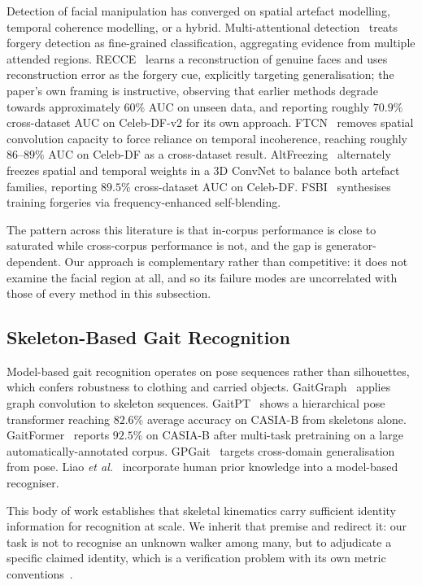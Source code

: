 \documentclass[journal]{IEEEtran}
\begin{document}
Detection of facial manipulation has converged on spatial artefact modelling,
temporal coherence modelling, or a hybrid. Multi-attentional
detection~\cite{multi_attn} treats forgery detection as fine-grained
classification, aggregating evidence from multiple attended regions.
RECCE~\cite{recce} learns a reconstruction of genuine faces and uses
reconstruction error as the forgery cue, explicitly targeting generalisation;
the paper's own framing is instructive, observing that earlier methods degrade
towards approximately $60\%$ AUC on unseen data, and reporting roughly $70.9\%$
cross-dataset AUC on Celeb-DF-v2 for its own approach. FTCN~\cite{ftcn} removes
spatial convolution capacity to force reliance on temporal incoherence,
reaching roughly $86$--$89\%$ AUC on Celeb-DF as a cross-dataset result.
AltFreezing~\cite{altfreezing} alternately freezes spatial and temporal weights
in a 3D ConvNet to balance both artefact families, reporting $89.5\%$
cross-dataset AUC on Celeb-DF. FSBI~\cite{fsbi} synthesises training forgeries
via frequency-enhanced self-blending.

The pattern across this literature is that in-corpus performance is close to
saturated while cross-corpus performance is not, and the gap is
generator-dependent. Our approach is complementary rather than competitive: it does not
examine the facial region at all, and so its failure modes are uncorrelated
with those of every method in this subsection.

\subsection{Skeleton-Based Gait Recognition}

Model-based gait recognition operates on pose sequences rather than
silhouettes, which confers robustness to clothing and carried objects.
GaitGraph~\cite{gaitgraph} applies graph convolution to skeleton sequences.
GaitPT~\cite{gaitpt} shows a hierarchical pose transformer reaching $82.6\%$
average accuracy on CASIA-B from skeletons alone. GaitFormer~\cite{gaitformer}
reports $92.5\%$ on CASIA-B after multi-task pretraining on a large
automatically-annotated corpus. GPGait~\cite{gpgait} targets cross-domain
generalisation from pose. Liao \emph{et al.}~\cite{liao_gait} incorporate human
prior knowledge into a model-based recogniser.

This body of work establishes that skeletal kinematics carry sufficient
identity information for recognition at scale. We inherit that premise and
redirect it: our task is not to recognise an unknown walker among many, but to
adjudicate a specific claimed identity, which is a verification problem with
its own metric conventions~\cite{iso19795}.
\end{document}
